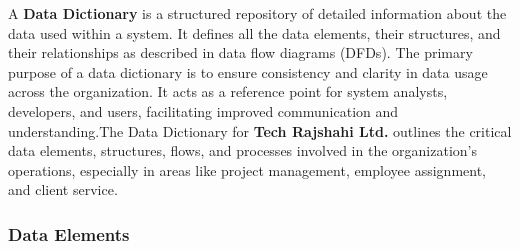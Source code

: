 \documentclass[12pt,a4paper]{article}
\begin{document}
A \textbf{Data Dictionary} is a structured repository of detailed information about the data used within a system. It defines all the data elements, their structures, and their relationships as described in data flow diagrams (DFDs). The primary purpose of a data dictionary is to ensure consistency and clarity in data usage across the organization. It acts as a reference point for system analysts, developers, and users, facilitating improved communication and understanding.The Data Dictionary for \textbf{Tech Rajshahi Ltd.} outlines the critical data elements, structures, flows, and processes involved in the organization’s operations, especially in areas like project management, employee assignment, and client service.


\subsubsection{Data Elements}
\end{document}
